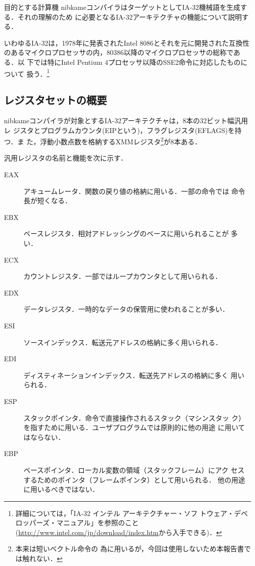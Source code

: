 \documentclass[a4paper,titlepage,report]{jsbook}
\begin{document}
\begin{resbonsiblesection}{目的とする計算機}{\kobori}\label{sc:target-machine}
nibkameコンパイラはターゲットとしてIA-32機械語を生成する．それの理解のため
に必要となるIA-32アーキテクチャの機能について説明する．

いわゆるIA-32は，1978年に発表されたIntel 8086とそれを元に開発された互換性
のあるマイクロプロセッサの内，80386以降のマイクロプロセッサの総称である．以
下では特にIntel Pentium 4プロセッサ以降のSSE2命令に対応したものについて
扱う．\footnote{詳細については，「IA-32 インテル アーキテクチャー・ソフ
トウェア・デベロッパーズ・マニュアル」を参照のこと
(\url{http://www.intel.com/jp/download/index.htm}から入手できる)．}


\subsection{レジスタセットの概要}\label{ssc:register_set}
nibkameコンパイラが対象とするIA-32アーキテクチャは，8本の32ビット幅汎用レ
ジスタとプログラムカウンタ(EIPという)，フラグレジスタ(EFLAGS)を持つ．ま
た，浮動小数点数を格納するXMMレジスタ\footnote{本来は短いベクトル命令の
為に用いるが，今回は使用しないため本報告書では触れない．}が8本ある．

汎用レジスタの名前と機能を次に示す．
\begin{description}
 \item[EAX] アキュームレータ．関数の戻り値の格納に用いる．一部の命令では
	    命令長が短くなる．
 \item[EBX] ベースレジスタ．相対アドレッシングのベースに用いられることが
	    多い．
 \item[ECX] カウントレジスタ．一部ではループカウンタとして用いられる．
 \item[EDX] データレジスタ．一時的なデータの保管用に使われることが多い．
 \item[ESI] ソースインデックス．転送元アドレスの格納に多く用いられる．
 \item[EDI] ディスティネーションインデックス．転送先アドレスの格納に多く
	    用いられる．
 \item[ESP] スタックポインタ．命令で直接操作されるスタック（マシンスタッ
	    ク）を指すために用いる．ユーザプログラムでは原則的に他の用途
	    に用いてはならない．
 \item[EBP] ベースポインタ．ローカル変数の領域（スタックフレーム）にアク
	    セスするためのポインタ（フレームポインタ）として用いられる．
	    他の用途に用いるべきではない． 
\end{description}


\end{resbonsiblesection}
\end{document}

